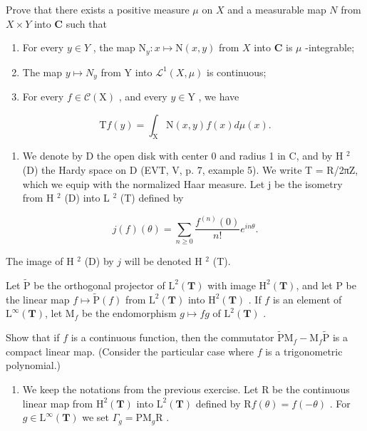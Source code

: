 Prove that there exists a positive measure \(\mu\) on \(X\) and a measurable map \(N\) from \(X \times Y\) into \(\mathbf{C}\) such that

\begin{enumerate}
\def\labelenumi{\alph{enumi})}
\item
  For every \(y \in Y\) , the map \(\mathrm{N}_{y} \colon x \mapsto \mathrm{N}(x, y)\) from \(X\) into \(\mathbf{C}\) is \(\mu\) -integrable;
\item
  The map \(y \mapsto N_{y}\) from Y into \(\mathcal{L}^{1}(X, \mu)\) is continuous;
\item
  For every \(f \in \mathcal{C}(\mathrm{X})\) , and every \(y \in \mathrm{Y}\) , we have
\end{enumerate}

\[
\mathrm{T} f (y) = \int_ {\mathrm{X}} \mathrm{N} (x, y) f (x) d \mu (x).
\]

\begin{enumerate}
\def\labelenumi{\arabic{enumi})}
\setcounter{enumi}{20}
\tightlist
\item
  We denote by D the open disk with center 0 and radius 1 in C, and by H \(^{2}\) (D) the Hardy space on D (EVT, V, p. 7, example 5). We write T = R/2πZ, which we equip with the normalized Haar measure. Let j be the isometry from H \(^{2}\) (D) into L \(^{2}\) (T) defined by
\end{enumerate}

\[
j (f) (\theta) = \sum_ {n \geqslant 0} \frac {f ^ {(n)} (0)}{n !} e ^ {i n \theta}.
\]

The image of H \(^{2}\) (D) by \(j\) will be denoted H \(^{2}\) (T).

Let \(\widetilde{\mathrm{P}}\) be the orthogonal projector of \(\mathrm{L}^2 (\mathbf{T})\) with image \(\mathrm{H}^2 (\mathbf{T})\), and let P be the linear map \(f\mapsto \widetilde{\mathrm{P}} (f)\) from \(\mathrm{L}^2 (\mathbf{T})\) into \(\mathrm{H}^2 (\mathbf{T})\) . If \(f\) is an element of \(\mathrm{L}^{\infty}(\mathbf{T})\), let \(\mathrm{M}_f\) be the endomorphism \(g\mapsto fg\) of \(\mathrm{L}^2 (\mathbf{T})\) .

Show that if \(f\) is a continuous function, then the commutator \(\widetilde{\mathrm{P}}\mathrm{M}_f - \mathrm{M}_f\widetilde{\mathrm{P}}\) is a compact linear map. (Consider the particular case where \(f\) is a trigonometric polynomial.)

\begin{enumerate}
\def\labelenumi{\arabic{enumi})}
\setcounter{enumi}{21}
\tightlist
\item
  We keep the notations from the previous exercise. Let R be the continuous linear map from \(\mathrm{H}^{2}(\mathbf{T})\) into \(\mathrm{L}^{2}(\mathbf{T})\) defined by \(\mathrm{R}f(\theta)=f(-\theta)\) . For \(g\in\mathrm{L}^{\infty}(\mathbf{T})\) we set \(\Gamma_{g}=\mathrm{PM}_{g}\mathrm{R}\) .
\end{enumerate}

